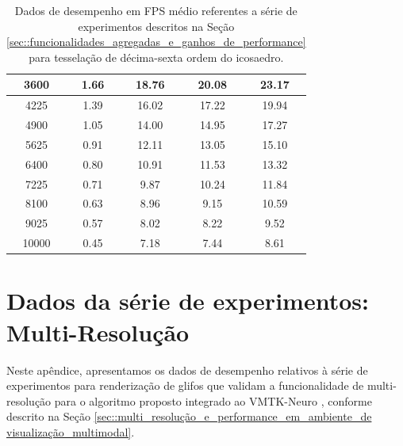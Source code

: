 \documentclass[
    12pt,                %
    oneside,            %
    a4paper,            %
    english,            %
    french,                %
    spanish,            %
    brazil                %
    ]{abntex2}
\begin{document}
\begin{apendicesenv}
\begin{table}[htb]
\begin{tabular}{c|c|c|c|c|}
\multicolumn{1}{|c|}{3600}      & 1.66                      & 18.76                     & 20.08                     & 23.17                    \\ \hline
\multicolumn{1}{|c|}{4225}      & 1.39                      & 16.02                     & 17.22                     & 19.94                    \\ \hline
\multicolumn{1}{|c|}{4900}      & 1.05                      & 14.00                     & 14.95                     & 17.27                    \\ \hline
\multicolumn{1}{|c|}{5625}      & 0.91                      & 12.11                     & 13.05                     & 15.10                    \\ \hline
\multicolumn{1}{|c|}{6400}      & 0.80                      & 10.91                     & 11.53                     & 13.32                    \\ \hline
\multicolumn{1}{|c|}{7225}      & 0.71                      & 9.87                      & 10.24                     & 11.84                    \\ \hline
\multicolumn{1}{|c|}{8100}      & 0.63                      & 8.96                      & 9.15                      & 10.59                    \\ \hline
\multicolumn{1}{|c|}{9025}      & 0.57                      & 8.02                      & 8.22                      & 9.52                     \\ \hline
\multicolumn{1}{|c|}{10000}     & 0.45                      & 7.18                      & 7.44                      & 8.61                     \\ \hline
\end{tabular}


\caption{Dados de desempenho em FPS médio referentes a série de experimentos descritos na Seção \ref{sec::funcionalidades_agregadas_e_ganhos_de_performance} para tesselação de décima-sexta ordem do icosaedro.}
\label{tab::testes_16}
\end{table}

\chapter{Dados da série de experimentos: Multi-Resolução}
\label{ap::performance_vmtk}

Neste apêndice, apresentamos os dados de desempenho relativos à série de experimentos para renderização de glifos que validam a funcionalidade de multi-resolução para o algoritmo proposto integrado ao VMTK-Neuro \cite{VMTKNeuro}, conforme descrito na Seção \ref{sec::multi_resolução_e_performance_em_ambiente_de visualização_multimodal}.


\end{apendicesenv}
\end{document}

